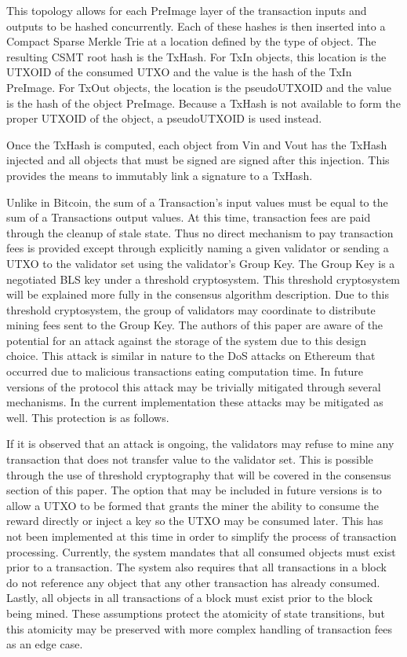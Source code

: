 This topology allows for each PreImage layer of the transaction inputs
and outputs to be hashed concurrently.
Each of these hashes is then inserted into a Compact Sparse Merkle Trie
at a location defined by the type of object.
The resulting CSMT root hash is the TxHash.
For TxIn objects, this location is the UTXOID of the consumed UTXO and
the value is the hash of the TxIn PreImage.
For TxOut objects, the location is the pseudoUTXOID and the value is
the hash of the object PreImage.
Because a TxHash is not available to form the proper UTXOID of the
object, a pseudoUTXOID is used instead.

Once the TxHash is computed, each object from Vin and Vout has the
TxHash injected and all objects that must be signed are signed after
this injection.
This provides the means to immutably link a signature to a TxHash.

Unlike in Bitcoin, the sum of a Transaction’s input values must be
equal to the sum of a Transactions output values.
At this time, transaction fees are paid through the cleanup of stale
state.
Thus no direct mechanism to pay transaction fees is provided except
through explicitly naming a given validator or sending a UTXO to the
validator set using the validator’s Group Key.
The Group Key is a negotiated BLS key under a threshold cryptosystem.
This threshold cryptosystem will be explained more fully in the
consensus algorithm description.
Due to this threshold cryptosystem, the group of validators may
coordinate to distribute mining fees sent to the Group Key.
The authors of this paper are aware of the potential for an attack
against the storage of the system due to this design choice.
This attack is similar in nature to the DoS attacks on Ethereum that
occurred due to malicious transactions eating computation time.
In future versions of the protocol this attack may be trivially
mitigated through several mechanisms.
In the current implementation these attacks may be mitigated as well.
This protection is as follows.

If it is observed that an attack is ongoing, the validators may refuse
to mine any transaction that does not transfer value to the validator
set.
This is possible through the use of threshold cryptography that will be
covered in the consensus section of this paper.
The option that may be included in future versions is to allow a UTXO
to be formed that grants the miner the ability to consume the reward
directly or inject a key so the UTXO may be consumed later.
This has not been implemented at this time in order to simplify the
process of transaction processing.
Currently, the system mandates that all consumed objects must exist
prior to a transaction.
The system also requires that all transactions in a block do not
reference any object that any other transaction has already consumed.
Lastly, all objects in all transactions of a block must exist prior to
the block being mined.
These assumptions protect the atomicity of state transitions, but this
atomicity may be preserved with more complex handling of transaction
fees as an edge case.


